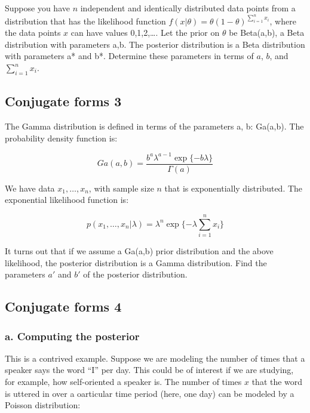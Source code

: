 \documentclass[12pt,]{krantz}
\begin{document}
Suppose you have \(n\) independent and identically distributed data points from a distribution that has
the likelihood function \(f(x|\theta)=\theta(1-\theta)^{\sum_{i=1}^n x_i}\),
where the data points \(x\) can have values 0,1,2,\dots. Let the prior on \(\theta\) be Beta(a,b), a Beta distribution with parameters a,b.
The posterior distribution is a Beta distribution with parameters a* and b*.
Determine these parameters in terms of \(a\), \(b\), and \(\sum_{i=1}^n x_i\).

\hypertarget{conjugate-forms-3}{%
\subsection{Conjugate forms 3}\label{conjugate-forms-3}}

The Gamma distribution is defined in terms of the parameters a, b: Ga(a,b). The probability density function is:

\begin{equation}
Ga(a,b)=\frac{b^a \lambda^{a-1} \exp\{-b\lambda\}}{\Gamma(a)}
\end{equation}

We have data \(x_1,\dots, x_n\), with sample size \(n\) that is exponentially distributed. The exponential likelihood function is:

\begin{equation}
p(x_1,\dots,x_n | \lambda)=\lambda^n \exp \{-\lambda \sum_{i=1}^n x_i \}
\end{equation}

It turns out that if we assume a Ga(a,b) prior distribution and the above likelihood, the posterior distribution is a Gamma distribution. Find the parameters \(a'\) and \(b'\) of the posterior distribution.

\hypertarget{conjugate-forms-4}{%
\subsection{Conjugate forms 4}\label{conjugate-forms-4}}

\hypertarget{a.-computing-the-posterior}{%
\subsubsection{a. Computing the posterior}\label{a.-computing-the-posterior}}

This is a contrived example. Suppose we are modeling the number of times that a speaker says the word ``I'' per day. This could be of interest if we are studying, for example, how self-oriented a speaker is. The number of times \(x\) that the word is uttered in over a oarticular time period (here, one day) can be modeled by a Poisson distribution:
\end{document}
